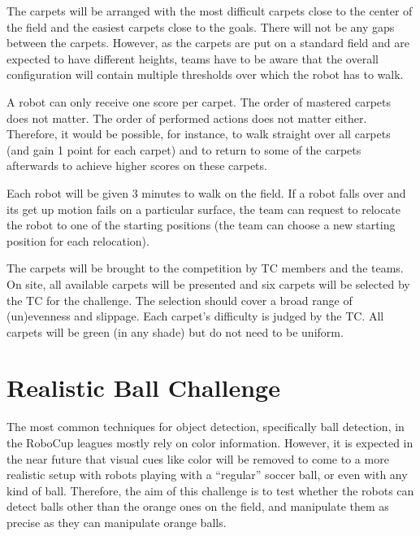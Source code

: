 \documentclass[12pt]{article}
\begin{document}
The carpets will be arranged with the most difficult carpets close to the center of the field and the easiest carpets close to the goals. There will not be any gaps between the carpets. However, as the carpets are put on a standard field and are expected to have different heights, teams have to be aware that the overall configuration will contain multiple thresholds over which the robot has to walk.

A robot can only receive one score per carpet. The order of mastered carpets does not matter. The order of performed actions does not matter either. Therefore, it would be possible, for instance, to walk straight over all carpets (and gain 1 point for each carpet) and to return to some of the carpets afterwards to achieve higher scores on these carpets.

Each robot will be given 3 minutes to walk on the field. If a robot falls over and its get up motion fails on a particular surface, the team can request to relocate the robot to one of the starting positions (the team can choose a new starting position for each relocation).

The carpets will be brought to the competition by TC members and the teams. On site, all available carpets will be presented and six carpets will be selected by the TC for the challenge. The selection should cover a broad range of (un)evenness and slippage. Each carpet's difficulty is judged by the TC. All carpets will be green (in any shade) but do not need to be uniform.


\newpage






\section{Realistic Ball Challenge}


The most common techniques for object detection, specifically ball detection, in the RoboCup leagues mostly rely on color information. However, it is expected in the near future that visual cues like color will be removed to come to a more realistic setup with robots playing with a ``regular'' soccer ball, or even with any kind of ball. Therefore, the aim of this challenge is to test whether the robots can detect balls other than the orange ones on the field, and manipulate them as precise as they can manipulate orange balls.
\end{document}
